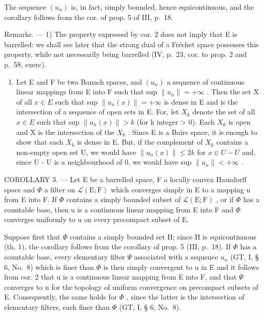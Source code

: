 The sequence \((u_{n})\) is, in fact, simply bounded, hence equicontinuous, and the corollary follows from the cor. of prop. 5 of III, p.~18.

Remarks. --- 1) The property expressed by cor. 2 does not imply that E is barrelled: we shall see later that the strong dual of a Fréchet space possesses this property, while not necessarily being barrelled (IV, p.~23, cor. to prop. 2 and p.~58, exerc).

\begin{enumerate}
\def\labelenumi{\arabic{enumi})}
\setcounter{enumi}{1}
\tightlist
\item
  Let E and F be two Banach spaces, and \((u_{n})\) a sequence of continuous linear mappings from E into F such that sup \(\|u_{n}\| = +\infty\) . Then the set X of all \(x \in E\) such that sup \(\|u_{n}(x)\| = +\infty\) is dense in E and is the intersection of a sequence of open sets in E. For, let \(X_{k}\) denote the set of all \(x \in E\) such that sup \(\|u_{n}(x)\| > k\) (for k integer \textgreater{} 0). Each \(X_{k}\) is open and X is the intersection of the \(X_{k}\) . Since E is a Baire space, it is enough to show that each \(X_{k}\) is dense in E. But, if the complement of \(X_{k}\) contains a non-empty open set U, we would have \(\|u_{n}(x)\| \leqslant 2k\) for \(x \in U - U\) and, since U - U is a neighbourhood of 0, we would have sup \(\|u_{n}\| < +\infty\) .
\end{enumerate}

COROLLARY 3. --- Let E be a barrelled space, F a locally convex Hausdorff space and \(\Phi\) a filter on \(\mathcal{L}(\mathrm{E};\mathrm{F})\) which converges simply in E to a mapping u from E into F. If \(\Phi\) contains a simply bounded subset of \(\mathcal{L}(\mathrm{E};\mathrm{F})\) , or if \(\Phi\) has a countable base, then u is a continuous linear mapping from E into F and \(\Phi\) converges uniformly to u on every precompact subset of E.

Suppose first that \(\Phi\) contains a simply bounded set H; since H is equicontinuous (th. 1), the corollary follows from the corollary of prop. 5 (III, p.~18). If \(\Phi\) has a countable base, every elementary filter \(\Psi\) associated with a sequence \(u_{n}\) (GT, I, § 6, No.~8) which is finer than \(\Phi\) is then simply convergent to u in E and it follows from cor. 2 that u is a continuous linear mapping from E into F, and that \(\Psi\) converges to u for the topology of uniform convergence on precompact subsets of E. Consequently, the same holds for \(\Phi\) , since the latter is the intersection of elementary filters, each finer than \(\Phi\) (GT, I, § 6, No.~8).

